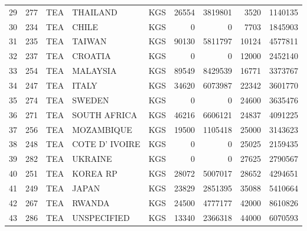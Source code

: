 \begin{tabular}{lrlllrrrr}
29 &    277 &       TEA &         THAILAND &  KGS &             26554 &            3819801 &              3520 &            1140135 \\
30 &    234 &       TEA &            CHILE &  KGS &                 0 &                  0 &              7703 &            1845903 \\
31 &    235 &       TEA &           TAIWAN &  KGS &             90130 &            5811797 &             10124 &            4577811 \\
32 &    237 &       TEA &          CROATIA &  KGS &                 0 &                  0 &             12000 &            2452140 \\
33 &    254 &       TEA &         MALAYSIA &  KGS &             89549 &            8429539 &             16771 &            3373767 \\
34 &    247 &       TEA &            ITALY &  KGS &             34620 &            6073987 &             22342 &            3601770 \\
35 &    274 &       TEA &           SWEDEN &  KGS &                 0 &                  0 &             24600 &            3635476 \\
36 &    271 &       TEA &     SOUTH AFRICA &  KGS &             46216 &            6606121 &             24837 &            4091225 \\
37 &    256 &       TEA &       MOZAMBIQUE &  KGS &             19500 &            1105418 &             25000 &            3143623 \\
38 &    248 &       TEA &   COTE D' IVOIRE &  KGS &                 0 &                  0 &             25025 &            2159435 \\
39 &    282 &       TEA &          UKRAINE &  KGS &                 0 &                  0 &             27625 &            2790567 \\
40 &    251 &       TEA &         KOREA RP &  KGS &             28072 &            5007017 &             28652 &            4294651 \\
41 &    249 &       TEA &            JAPAN &  KGS &             23829 &            2851395 &             35088 &            5410664 \\
42 &    267 &       TEA &           RWANDA &  KGS &             24500 &            4777177 &             42000 &            8610826 \\
43 &    286 &       TEA &      UNSPECIFIED &  KGS &             13340 &            2366318 &             44000 &            6070593 \\

\end{tabular}
